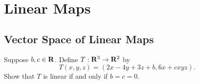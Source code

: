 \chapter{Linear Maps}

\section{Vector Space of Linear Maps}

\begin{exercise}
    Suppose $b,c \in \mathbf{R}$. Define $T: \mathbf{R}^3 \to \mathbf{R}^2$ by
    $$T(x,y,z) = (2x-4y + 3z + b, 6x + cxyz).$$
    Show that $T$ is linear if and only if $b = c = 0$. \\
\end{exercise}

\begin{solution}
    \\ \td \\
\end{solution}